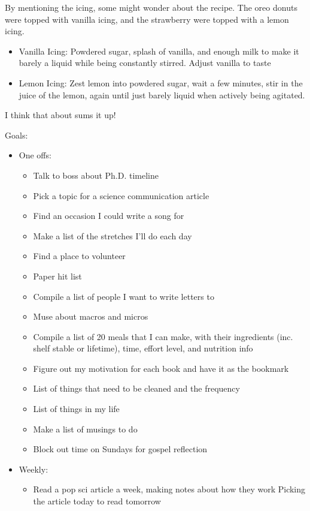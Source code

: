 \documentclass[12pt]{article}[titlepage]
\renewcommand{\,}{\textsuperscript{,}}
\begin{document}
By mentioning the icing, some might wonder about the recipe.  
The oreo donuts were topped with vanilla icing, and the strawberry were topped with a lemon icing.  
\begin{itemize}  
\item Vanilla Icing: Powdered sugar, splash of vanilla, and enough milk to make it barely a liquid while being constantly stirred. Adjust vanilla to taste  
\item Lemon Icing: Zest lemon into powdered sugar, wait a few minutes, stir in the juice of the lemon, again until just barely liquid when actively being agitated.  
\end{itemize}

I think that about sums it up!

Goals:  
\begin{itemize}  
\item One offs:  
\begin{itemize}  
\item Talk to boss about Ph.D. timeline  
\item Pick a topic for a science communication article  
\item Find an occasion I could write a song for  
\item Make a list of the stretches I'll do each day  
\item Find a place to volunteer  
\item Paper hit list  
\item Compile a list of people I want to write letters to  
\item Muse about macros and micros  
\item Compile a list of 20 meals that I can make, with their ingredients (inc. shelf stable or lifetime), time, effort level, and nutrition info  
\item Figure out my motivation for each book and have it as the bookmark  
\item List of things that need to be cleaned and the frequency  
\item List of things in my life  
\item Make a list of musings to do  
\item Block out time on Sundays for gospel reflection  
\end{itemize}  
\item Weekly:  
\begin{itemize}  
\item Read a pop sci article a week, making notes about how they work \-\> Picking the article today to read tomorrow  

\end{itemize}
\end{itemize}
\end{document}
